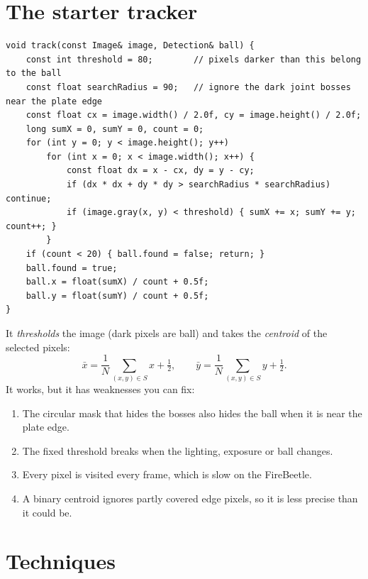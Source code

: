 \documentclass[10pt,a4paper]{article}
\begin{document}
\section{The starter tracker}
\begin{lstlisting}
void track(const Image& image, Detection& ball) {
    const int threshold = 80;        // pixels darker than this belong to the ball
    const float searchRadius = 90;   // ignore the dark joint bosses near the plate edge
    const float cx = image.width() / 2.0f, cy = image.height() / 2.0f;
    long sumX = 0, sumY = 0, count = 0;
    for (int y = 0; y < image.height(); y++)
        for (int x = 0; x < image.width(); x++) {
            const float dx = x - cx, dy = y - cy;
            if (dx * dx + dy * dy > searchRadius * searchRadius) continue;
            if (image.gray(x, y) < threshold) { sumX += x; sumY += y; count++; }
        }
    if (count < 20) { ball.found = false; return; }
    ball.found = true;
    ball.x = float(sumX) / count + 0.5f;
    ball.y = float(sumY) / count + 0.5f;
}
\end{lstlisting}
It \emph{thresholds} the image (dark pixels are ball) and takes the \emph{centroid} of the
selected pixels:
\begin{equation}
  \bar x=\frac{1}{N}\sum_{(x,y)\in S}x+\tfrac12,\qquad \bar y=\frac{1}{N}\sum_{(x,y)\in S}y+\tfrac12 .
\end{equation}
It works, but it has weaknesses you can fix:
\begin{enumerate}
  \item The circular mask that hides the bosses also hides the ball when it is near the plate
        edge.
  \item The fixed threshold breaks when the lighting, exposure or ball changes.
  \item Every pixel is visited every frame, which is slow on the FireBeetle.
  \item A binary centroid ignores partly covered edge pixels, so it is less precise than it could
        be.
\end{enumerate}

\section{Techniques}
\end{document}
